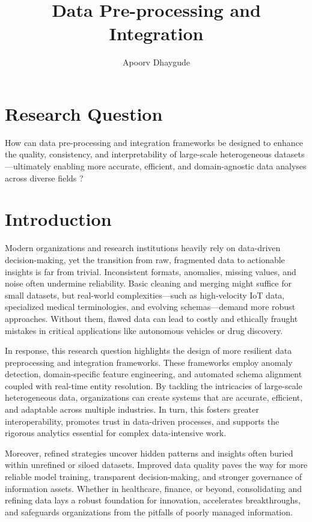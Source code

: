 \documentclass[12pt]{article}
\begin{document}
\title{Data Pre-processing and Integration}
\author{Apoorv Dhaygude}
\date{}
\maketitle
\newpage

\tableofcontents

\newpage
\newpage
\section{Research Question}
How can data pre-processing and integration frameworks be designed to enhance the quality, consistency, and interpretability of large-scale heterogeneous datasets—ultimately enabling more accurate, efficient, and domain-agnostic data analyses across diverse fields ?

\section{Introduction}
Modern organizations and research institutions heavily rely on data-driven decision-making, yet the transition from raw, fragmented data to actionable insights is far from trivial. Inconsistent formats, anomalies, missing values, and noise often undermine reliability. Basic cleaning and merging might suffice for small datasets, but real-world complexities—such as high-velocity IoT data, specialized medical terminologies, and evolving schemas—demand more robust approaches. Without them, flawed data can lead to costly and ethically fraught mistakes in critical applications like autonomous vehicles or drug discovery.

In response, this research question highlights the design of more resilient data preprocessing and integration frameworks. These frameworks employ anomaly detection, domain-specific feature engineering, and automated schema alignment coupled with real-time entity resolution. By tackling the intricacies of large-scale heterogeneous data, organizations can create systems that are accurate, efficient, and adaptable across multiple industries. In turn, this fosters greater interoperability, promotes trust in data-driven processes, and supports the rigorous analytics essential for complex data-intensive work.

Moreover, refined strategies uncover hidden patterns and insights often buried within unrefined or siloed datasets. Improved data quality paves the way for more reliable model training, transparent decision-making, and stronger governance of information assets. Whether in healthcare, finance, or beyond, consolidating and refining data lays a robust foundation for innovation, accelerates breakthroughs, and safeguards organizations from the pitfalls of poorly managed information.
\end{document}
